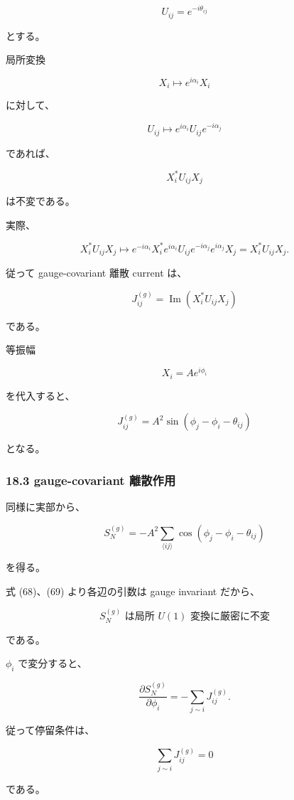\documentclass[
  a4paper,
]{ltjsarticle}
\begin{document}
\[
\boxed{
U_{ij}
=
e^{-i\theta_{ij}}
}
\tag{71}
\]

とする。

局所変換

\[
X_i
\mapsto
e^{i\alpha_i}X_i
\]

に対して、

\[
U_{ij}
\mapsto
e^{i\alpha_i}
U_{ij}
e^{-i\alpha_j}
\]

であれば、

\[
X_i^*U_{ij}X_j
\]

は不変である。

実際、

\[
X_i^*U_{ij}X_j
\mapsto
e^{-i\alpha_i}X_i^*
e^{i\alpha_i}U_{ij}e^{-i\alpha_j}
e^{i\alpha_j}X_j
=
X_i^*U_{ij}X_j.
\]

従って gauge-covariant 離散 current は、

\[
\boxed{
J_{ij}^{(g)}
=
\operatorname{Im}
\left(
X_i^*U_{ij}X_j
\right)
}
\tag{72}
\]

である。

等振幅

\[
X_i=Ae^{i\phi_i}
\]

を代入すると、

\[
\boxed{
J_{ij}^{(g)}
=
A^2
\sin
\left(
\phi_j-\phi_i-\theta_{ij}
\right)
}
\tag{73}
\]

となる。

\subsubsection{18.3 gauge-covariant
離散作用}\label{gauge-covariant-ux96e2ux6563ux4f5cux7528}

同様に実部から、

\[
\boxed{
S_N^{(g)}
=
-A^2
\sum_{\langle ij\rangle}
\cos
\left(
\phi_j-\phi_i-\theta_{ij}
\right)
}
\tag{74}
\]

を得る。

式 (68)、(69) より各辺の引数は gauge invariant だから、

\[
\boxed{
S_N^{(g)}
\text{ は局所 }U(1)\text{ 変換に厳密に不変}
}
\tag{75}
\]

である。

\(\phi_i\) で変分すると、

\[
\frac{\partial S_N^{(g)}}{\partial\phi_i}
=
-\sum_{j\sim i}
J_{ij}^{(g)}.
\]

従って停留条件は、

\[
\boxed{
\sum_{j\sim i}
J_{ij}^{(g)}
=
0
}
\tag{76}
\]

である。
\end{document}

